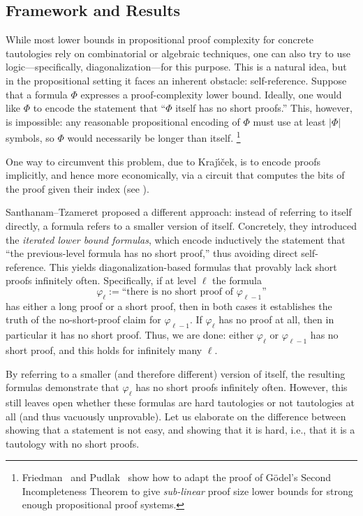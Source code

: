 \documentclass[11pt,letter]{article}
\theoremstyle{remark} %
\begin{document}
 



 
\subsection{Framework and Results}\label{sec:framework-results}

While most lower bounds in propositional proof complexity for concrete tautologies rely on combinatorial or algebraic techniques, one can also try to use logic—specifically, diagonalization—for this purpose. 
This is a natural idea, but in the propositional setting it faces an inherent obstacle: self-reference.  
Suppose that a formula $\Phi$ expresses a proof-complexity lower bound. Ideally, one would like $\Phi$ to encode the statement that ``$\Phi$ itself has no short proofs.'' This, however, is impossible: any reasonable propositional encoding of $\Phi$ must use at least $|\Phi|$ symbols, so $\Phi$ would necessarily be longer than itself.%
\footnote{Friedman~\cite{Friedman79} and Pudlak~\cite{Pudlak86, Pudlak87} show how to adapt the proof of G\"{o}del's Second Incompleteness Theorem to give {\it sub-linear} proof size lower bounds for strong enough propositional proof systems.}

One way to circumvent this problem, due to Kraj\'{\i}\v{c}ek, is to encode proofs implicitly, and hence more economically, via a circuit that computes the bits of the proof given their index (see \cite{Krajicek04b}).  

Santhanam--Tzameret \cite{ST25} proposed a different approach: instead of referring to itself directly, a formula refers to a smaller version of itself.  
Concretely, they introduced the \emph{iterated lower bound formulas}, which encode inductively the statement that ``the previous-level formula has no short proof,'' thus avoiding direct self-reference. This yields diagonalization-based formulas that provably lack short proofs infinitely often. Specifically, if at level $\ell$ the formula  
\[
\varphi_\ell := \text{``there is no short proof of } \varphi_{\ell-1}\text{''}
\]  
has either a long proof or a short proof, then in both cases it establishes the truth of the no-short-proof claim for $\varphi_{\ell-1}$. If $\varphi_\ell$ has no proof at all, then in particular it has no short proof. Thus, we are done: either $\varphi_\ell$ or $\varphi_{\ell-1}$ has no short proof, and this holds for infinitely many $\ell$.


By referring to a smaller (and therefore different) version of itself, the resulting formulas demonstrate that $\varphi_\ell$ has no short proofs infinitely often. However, this still leaves open whether these formulas are hard tautologies or not tautologies at all (and thus vacuously unprovable). Let us elaborate on the difference between showing that a statement is not easy, and showing that it is hard, i.e., that it is a tautology with no short proofs.  
\end{document}
